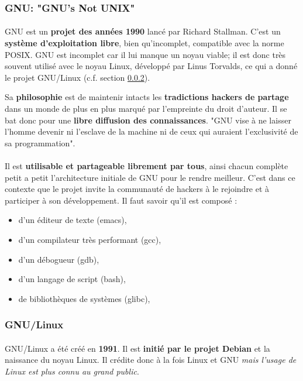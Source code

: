 \subsubsection{GNU: "GNU's Not UNIX"}\label{subsubsec:gnu}

\paragraph{} GNU est un \textbf{projet des années 1990} lancé par Richard
Stallman. C'est un \textbf{système d'exploitation libre}, bien qu'incomplet,
compatible avec la norme POSIX. GNU est incomplet car il lui manque un noyau
viable; il est donc très souvent utilisé avec le noyau Linux, développé par
Linus Torvalds, ce qui a donné le projet GNU/Linux (c.f. section
\ref{subsubsec:gnulinux}).

Sa \textbf{philosophie} est de maintenir intacts les \textbf{tradictions hackers
de partage} dans un monde de plus en plus marqué par l'empreinte du droit
d'auteur. Il se bat donc pour une \textbf{libre diffusion des connaissances}.
"GNU vise à ne laisser l'homme devenir ni l'esclave de la machine ni de ceux
qui auraient l'exclusivité de sa programmation".

\paragraph{} Il est \textbf{utilisable et partageable librement par tous},
ainsi chacun complète petit a petit l'architecture initiale de GNU pour le
rendre meilleur. C'est dans ce contexte que le projet invite la communauté de
hackers à le rejoindre et à participer à son développement. Il faut savoir
qu'il est composé :

\begin{itemize}
	\item d'un éditeur de texte (emacs),
	\item d'un compilateur très performant (gcc),
	\item d'un débogueur (gdb),
	\item d'un langage de script (bash),
	\item de bibliothèques de systèmes (glibc),
\end{itemize}

\subsubsection{GNU/Linux}\label{subsubsec:gnulinux}

\paragraph{} GNU/Linux a été créé en \textbf{1991}. Il est \textbf{initié par
le projet Debian} et la naissance du noyau Linux. Il crédite donc à la fois
Linux et GNU \textit{mais l'usage de Linux est plus connu au grand public}.

